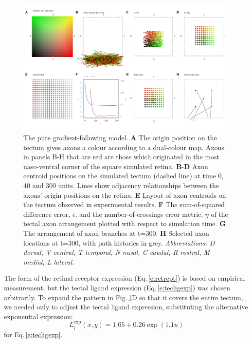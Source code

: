 \documentclass[11pt, a4paper, draft]{article}
\begin{document}
\begin{figure}
\includegraphics[width=\linewidth]{./images/j4_ee_G_wt_fig2.png}
\caption{The pure gradient-following model. \textbf{A} The origin position
on the tectum gives axons a colour according to a dual-colour map. Axons in
panels B-H that are red are those which originated in the most naso-ventral
corner of the square simulated retina. \textbf{B}-\textbf{D} Axon centroid
positions on the simulated tectum (dashed line) at time 0, 40 and 300
units. Lines show adjacency relationships between the axons' origin positions
on the retina. \textbf{E} Layout of axon centroids on the tectum observed in
experimental results. \textbf{F} The sum-of-squared difference error,
$\epsilon$, and the number-of-crossings error metric, $\eta$ of the tectal axon
arrangement plotted with respect to simulation time. \textbf{G} The
arrangement of axon branches at t=300. \textbf{H} Selected axon locations at
t=300, with path histories in grey.  \emph{Abbreviations: D dorsal, V ventral, T
temporal, N nasal, C caudal, R rostral, M medial, L lateral.}}
\label{f:G}
\end{figure}

The form of the retinal receptor expression (Eq.\,\ref{e:retrcpt}) is based on
empirical measurement, but the tectal ligand expression
(Eq.\,\ref{e:tecligexp}) was chosen arbitrarily. To expand the pattern in
Fig.\,\ref{f:G}D so that it covers the entire tectum, we needed only to
adjust the tectal ligand expression, substituting the alternative exponential
expression:
%
\begin{equation} \label{e:tecligexp2}
L_i^{\text{exp}}(x,y) = 1.05 + 0.26 \exp(1.1 u)
\end{equation}
%
for Eq.\,\ref{e:tecligexp}.
\end{document}
